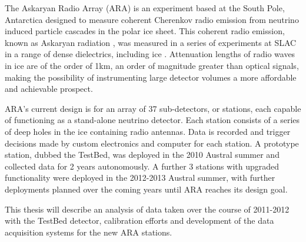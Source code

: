 The Askaryan Radio Array (ARA) is an experiment based at the South Pole, Antarctica designed to measure coherent Cherenkov radio emission from neutrino induced particle cascades in the polar ice sheet. This coherent radio emission, known as Askaryan radiation \cite{Askaryan1965} \cite{Askaryan1962}, was measured in a series of experiments at SLAC in a range of dense dielectrics, including ice \cite{PhysRevLett.86.2802} \cite{PhysRevD.72.023002} \cite{PhysRevLett.99.171101}. Attenuation lengths of radio waves in ice are of the order of 1km, an order of magnitude greater than optical signals, making the possibility of instrumenting large detector volumes a more affordable and achievable prospect.

ARA's current design is for an array of 37 sub-detectors, or stations, each capable of functioning as a stand-alone neutrino detector. Each station consists of a series of deep holes in the ice containing radio antennas. Data is recorded and trigger decisions made by custom electronics and computer for each station. A prototype station, dubbed the TestBed, was deployed in the 2010 Austral summer and collected data for 2 years autonomously. A further 3 stations with upgraded functionality were deployed in the 2012-2013 Austral summer, with further deployments planned over the coming years until ARA reaches its design goal.

This thesis will describe an analysis of data taken over the course of 2011-2012 with the TestBed detector, calibration efforts and development of the data acquisition systems for the new ARA stations.
